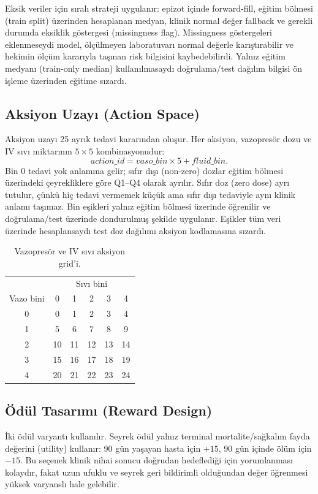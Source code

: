 \documentclass[conference]{IEEEtran}
\begin{document}
Eksik veriler için sıralı strateji uygulanır: epizot içinde forward-fill, eğitim bölmesi (train split) üzerinden hesaplanan medyan, klinik normal değer fallback ve gerekli durumda eksiklik göstergesi (missingness flag). Missingness göstergeleri eklenmeseydi model, ölçülmeyen laboratuvarı normal değerle karıştırabilir ve hekimin ölçüm kararıyla taşınan risk bilgisini kaybedebilirdi. Yalnız eğitim medyanı (train-only median) kullanılmasaydı doğrulama/test dağılım bilgisi ön işleme üzerinden eğitime sızardı.

\subsection{Aksiyon Uzayı (Action Space)}
Aksiyon uzayı 25 ayrık tedavi kararından oluşur. Her aksiyon, vazopresör dozu ve IV sıvı miktarının $5\times5$ kombinasyonudur:
\begin{equation}
action\_id = vaso\_bin \times 5 + fluid\_bin.
\end{equation}
Bin 0 tedavi yok anlamına gelir; sıfır dışı (non-zero) dozlar eğitim bölmesi üzerindeki çeyrekliklere göre Q1--Q4 olarak ayrılır. Sıfır doz (zero dose) ayrı tutulur, çünkü hiç tedavi vermemek küçük ama sıfır dışı tedaviyle aynı klinik anlamı taşımaz. Bin eşikleri yalnız eğitim bölmesi üzerinde öğrenilir ve doğrulama/test üzerinde dondurulmuş şekilde uygulanır. Eşikler tüm veri üzerinde hesaplansaydı test doz dağılımı aksiyon kodlamasına sızardı.

\begin{table}[t]
\centering
\caption{Vazopresör ve IV sıvı aksiyon grid'i.}
\label{tab:action_grid}
\begin{tabular}{c|ccccc}
\toprule
 & \multicolumn{5}{c}{Sıvı bini} \\
Vazo bini & 0 & 1 & 2 & 3 & 4 \\
\midrule
0 & 0 & 1 & 2 & 3 & 4 \\
1 & 5 & 6 & 7 & 8 & 9 \\
2 & 10 & 11 & 12 & 13 & 14 \\
3 & 15 & 16 & 17 & 18 & 19 \\
4 & 20 & 21 & 22 & 23 & 24 \\
\bottomrule
\end{tabular}
\end{table}

\subsection{Ödül Tasarımı (Reward Design)}
İki ödül varyantı kullanılır. Seyrek ödül yalnız terminal mortalite/sağkalım fayda değerini (utility) kullanır: 90 gün yaşayan hasta için $+15$, 90 gün içinde ölüm için $-15$. Bu seçenek klinik nihai sonucu doğrudan hedeflediği için yorumlanması kolaydır, fakat uzun ufuklu ve seyrek geri bildirimli olduğundan değer öğrenmesi yüksek varyanslı hale gelebilir.
\end{document}
